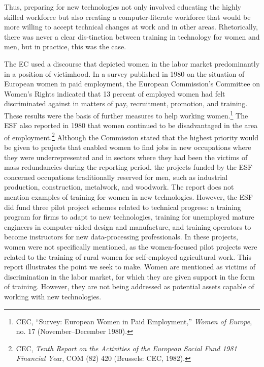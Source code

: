 \documentclass{tufte-handout}
\begin{document}
Thus, preparing for new technologies not only involved educating the
highly skilled workforce but also creating a computer-literate workforce
that would be more willing to accept technical changes at work and in
other areas. Rhetorically, there was never a clear dis-\newpage\noindent tinction between
training in technology for women and men, but in practice, this was the
case.

The EC used a discourse that depicted women in the labor market
predominantly in a position of victimhood. In a survey published in 1980
on the situation of European women in paid employment, the European
Commission's Committee on Women's Rights indicated that 13 percent of
employed women had felt discriminated against in matters of pay,
recruitment, promotion, and training. These results were the basis of
further measures to help working women.\footnote{CEC, ``Survey: European
  Women in Paid Employment,'' \emph{Women of Europe}, no. 17
  (November--December 1980).} The ESF also reported in 1980 that women
continued to be disadvantaged in the area of employment.\footnote{CEC,
  \emph{Tenth Report on the Activities of the European Social Fund 1981
  Financial Yea}r, COM (82) 420 (Brussels: CEC, 1982).} Although the
Commission stated that the highest priority would be given to projects
that enabled women to find jobs in new occupations where they were
underrepresented and in sectors where they had been the victims of mass
redundancies during the reporting period, the projects funded by the ESF
concerned occupations traditionally reserved for men, such as industrial
production, construction, metalwork, and woodwork. The report does not
mention examples of training for women in new technologies. However, the
ESF did fund three pilot project schemes related to technical progress:
a training program for firms to adapt to new technologies, training for
unemployed mature engineers in computer-aided design and manufacture,
and training operators to become instructors for new data-processing
professionals. In these projects, women were not specifically mentioned,
as the women-focused pilot projects were related to the training of
rural women for self-employed agricultural work. This report illustrates
the point we seek to make. Women are mentioned as victims of
discrimination in the labor market, for which they are given support in
the form of training. However, they are not being addressed as potential
assets capable of working with new technologies.
\end{document}
